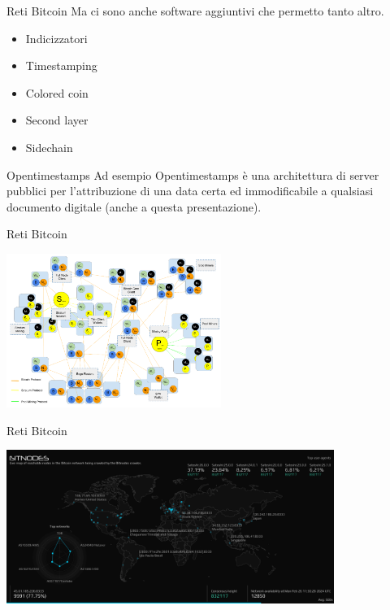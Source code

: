 \documentclass[aspectratio=169]{beamer}
\begin{document}
\begin{frame}{Reti Bitcoin}
    Ma ci sono anche software aggiuntivi che permetto tanto altro.

    \begin{itemize}
        \item Indicizzatori
        \item Timestamping
        \item Colored coin 
        \item Second layer
        \item Sidechain
    \end{itemize}

    \begin{alertblock}{Opentimestamps}
        Ad esempio Opentimestamps è una architettura di server pubblici per l'attribuzione di una data certa ed immodificabile a qualsiasi documento digitale (anche a questa presentazione).
    \end{alertblock}

\end{frame}

\begin{frame}{Reti Bitcoin}
    \begin{center}
        \includegraphics[height=5cm]{nodi.png}
    \end{center}
\end{frame}

\begin{frame}{Reti Bitcoin}
    \begin{center}
        \includegraphics[height=5cm]{nodi_2.png}
    \end{center}
\end{frame}
\end{document}
